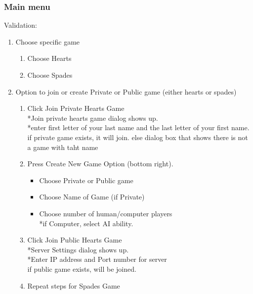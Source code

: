 \documentclass[11pt, titlepage]{article}
\begin{document}
	      	\subsubsection{Main menu}
	      	Validation:
	      	\begin{enumerate}
	      		\item Choose specific game
	      		      \begin{enumerate}
	      		      	\item Choose Hearts
	      		      	\item Choose Spades
	      		      \end{enumerate}
	      		\item Option to join or create Private or Public game (either hearts or spades)
	      		      \begin{enumerate}
	      		      	\item Click Join Private Hearts Game
	      		      	      \\*Join private hearts game dialog shows up.
	      		      	      \\*enter first letter of your last name and the last letter of your first name.
	      		      	      \\if private game exists, it will join. else dialog box that shows there is not a game with taht name

	      		      	\item Press Create New Game Option (bottom right).
	      		      	      \begin{itemize}
	      		      	      	\item Choose Private or Public game
	      		      	      	\item Choose Name of Game (if Private)
	      		      	      	\item Choose number of human/computer players
	      		      	      	      \\*if Computer, select AI ability.
	      		      	      \end{itemize}
	      		      	\item Click Join Public Hearts Game
	      		      	      \\*Server Settings dialog shows up.
	      		      	      \\*Enter IP address and Port number for server
	      		      	      \\if public game exists, will be joined.

	      		      	\item Repeat steps  for Spades Game


	      		      \end{enumerate}
	      	\end{enumerate}
\end{document}
